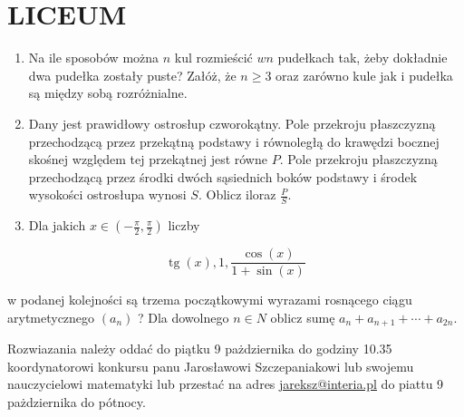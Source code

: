 \documentclass[10pt]{article}
\begin{document}
\section*{LICEUM}
\begin{enumerate}
  \item Na ile sposobów można \(n\) kul rozmieścić \(w n\) pudełkach tak, żeby dokładnie dwa pudełka zostały puste? Załóż, że \(n \geq 3\) oraz zarówno kule jak i pudełka są między sobą rozróżnialne.
  \item Dany jest prawidłowy ostrosłup czworokątny. Pole przekroju płaszczyzną przechodzącą przez przekątną podstawy i równoległą do krawędzi bocznej skośnej względem tej przekątnej jest równe \(P\). Pole przekroju płaszczyzną przechodzącą przez środki dwóch sąsiednich boków podstawy i środek wysokości ostrosłupa wynosi \(S\). Oblicz iloraz \(\frac{P}{S}\).
  \item Dla jakich \(x \in\left(-\frac{\pi}{2}, \frac{\pi}{2}\right)\) liczby
\end{enumerate}

\[
\operatorname{tg}(x), 1, \frac{\cos (x)}{1+\sin (x)}
\]

w podanej kolejności są trzema początkowymi wyrazami rosnącego ciągu arytmetycznego \(\left(a_{n}\right)\) ? Dla dowolnego \(n \in N\) oblicz sumę \(a_{n}+a_{n+1}+\cdots+a_{2 n}\).

Rozwiazania należy oddać do piątku 9 pażdziernika do godziny 10.35 koordynatorowi konkursu panu Jarosławowi Szczepaniakowi lub swojemu nauczycielowi matematyki lub przestać na adres \href{mailto:jareksz@interia.pl}{jareksz@interia.pl} do piattu 9 pażdziernika do pótnocy.
\end{document}
